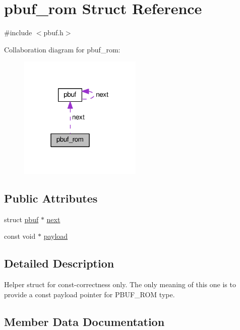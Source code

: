 \hypertarget{structpbuf__rom}{}\section{pbuf\+\_\+rom Struct Reference}
\label{structpbuf__rom}


{\ttfamily \#include $<$pbuf.\+h$>$}



Collaboration diagram for pbuf\+\_\+rom\+:
\nopagebreak
\begin{figure}[H]
\begin{center}
\leavevmode
\includegraphics[width=166pt]{structpbuf__rom__coll__graph}
\end{center}
\end{figure}
\subsection*{Public Attributes}
\begin{DoxyCompactItemize}
\item 
struct \hyperlink{structpbuf}{pbuf} $\ast$ \hyperlink{structpbuf__rom_af90b737ec50297dd448f754b573fbb18}{next}
\item 
const void $\ast$ \hyperlink{structpbuf__rom_a7fe9a84bcf524bae1898941aefee1ad5}{payload}
\end{DoxyCompactItemize}


\subsection{Detailed Description}
Helper struct for const-\/correctness only. The only meaning of this one is to provide a const payload pointer for P\+B\+U\+F\+\_\+\+R\+OM type. 

\subsection{Member Data Documentation}
\mbox{\label{structpbuf__rom_af90b737ec50297dd448f754b573fbb18}} 
